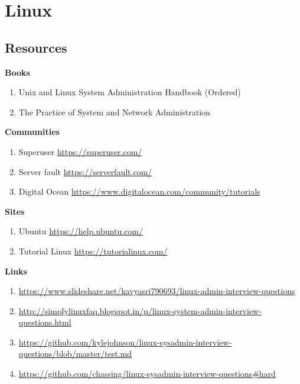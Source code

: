 \documentclass{notes}
\begin{document}
\tableofcontents
\chapter{Linux}
\section{Resources}
	\textbf{Books}
		\begin{enumerate}
			\item Unix and Linux System Administration Handbook (Ordered)
			\item The Practice of System and Network Administration
		\end{enumerate}
	\textbf{Communities}
		\begin{enumerate}
			\item Superuser \ra \url{https://superuser.com/}
			\item Server fault \ra \url{https://serverfault.com/}
			\item Digital Ocean \ra \url{https://www.digitalocean.com/community/tutorials}
		\end{enumerate}
	\textbf{Sites}
		\begin{enumerate}
			\item Ubuntu \ra \url{https://help.ubuntu.com/}
			\item Tutorial Linux \ra \url{https://tutorialinux.com/}
		\end{enumerate}
	\textbf{Links}
		\begin{enumerate}
			\item \url{https://www.slideshare.net/kavyasri790693/linux-admin-interview-questions}
			\item \url{http://simplylinuxfaq.blogspot.in/p/linux-system-admin-interview-questions.html}
			\item \url{https://github.com/kylejohnson/linux-sysadmin-interview-questions/blob/master/test.md}
			\item \url{https://github.com/chassing/linux-sysadmin-interview-questions#hard}
		\end{enumerate}
\end{document}
